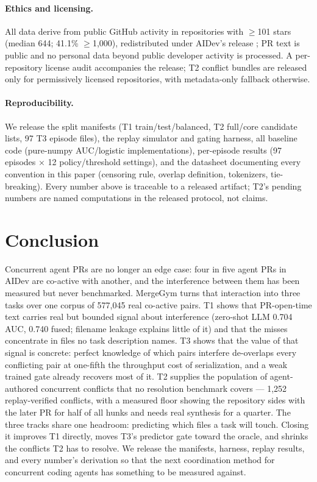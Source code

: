 \documentclass{article}
\begin{document}
\paragraph{Ethics and licensing.} All data derive from public GitHub activity in repositories with $\geq$101 stars (median 644; 41.1\% $\geq$1{,}000), redistributed under AIDev's release \citep{li2026aidev}; PR text is public and no personal data beyond public developer activity is processed. %
A per-repository license audit accompanies the release; T2 conflict bundles are released only for permissively licensed repositories, with metadata-only fallback otherwise.

\paragraph{Reproducibility.} We release the split manifests (T1 train/test/balanced, T2 full/core candidate lists, 97 T3 episode files), the replay simulator and gating harness, all baseline code (pure-numpy AUC/logistic implementations), per-episode results (97 episodes $\times$ 12 policy/threshold settings), and the datasheet documenting every convention in this paper (censoring rule, overlap definition, tokenizers, tie-breaking). Every number above is traceable to a released artifact; T2's pending numbers are named computations in the released protocol, not claims.


\section{Conclusion}
Concurrent agent PRs are no longer an edge case: four in five agent PRs in AIDev are co-active with another, and the interference between them has been measured but never benchmarked. MergeGym turns that interaction into three tasks over one corpus of 577{,}045 real co-active pairs. T1 shows that PR-open-time text carries real but bounded signal about interference (zero-shot LLM 0.704 AUC, 0.740 fused; filename leakage explains little of it) and that the misses concentrate in files no task description names. T3 shows that the value of that signal is concrete: perfect knowledge of which pairs interfere de-overlaps every conflicting pair at one-fifth the throughput cost of serialization, and a weak trained gate already recovers most of it. T2 supplies the population of agent-authored concurrent conflicts that no resolution benchmark covers --- 1{,}252 replay-verified conflicts, with a measured floor showing the repository sides with the later PR for half of all hunks and needs real synthesis for a quarter. The three tracks share one headroom: predicting which files a task will touch. Closing it improves T1 directly, moves T3's predictor gate toward the oracle, and shrinks the conflicts T2 has to resolve. We release the manifests, harness, replay results, and every number's derivation so that the next coordination method for concurrent coding agents has something to be measured against.
\end{document}
